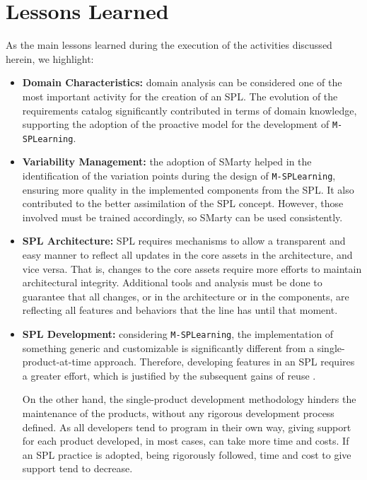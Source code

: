 \section{Lessons Learned}\label{section4}

As the main lessons learned during the execution of the activities discussed herein, we highlight:

\begin{itemize}
\setlength\itemsep{1em}
\item \textbf{Domain Characteristics:} domain analysis can be considered one of the most important activity for the creation of an SPL. The evolution of the requirements catalog \cite{filho13} significantly contributed in terms of domain knowledge, supporting the adoption of the proactive model for the development of \texttt{M-SPLear\allowbreak ning}.
    
\item \textbf{Variability Management:} the adoption of SMarty helped in the identification of the variation points during the design of \texttt{M-SPLear\allowbreak ning}, ensuring more quality in the implemented components from the SPL. It also contributed to the better assimilation of the SPL concept. However, those involved must be trained accordingly, so SMarty can be used consistently.
    
\item \textbf{SPL Architecture:} SPL requires mechanisms to allow a transparent and easy manner to reflect all updates in the core assets in the architecture, and vice versa. That is, changes to the core assets require more efforts to maintain architectural integrity. Additional tools and analysis must be done to guarantee that all changes, or in the architecture or in the components, are reflecting all features and behaviors that the line has until that moment.
    
\item \textbf{SPL Development:} considering \texttt{M-SPLear\allowbreak ning}, the implementation of something generic and customizable is significantly different from a single-product-at-time approach. Therefore, developing features in an SPL requires a greater effort, which is justified by the subsequent gains of reuse \cite{clements02}.

On the other hand, the single-product development methodology hinders the maintenance of the products, without any rigorous development process defined. As all developers tend to program in their own way, giving support for each product developed, in most cases, can take more time and costs. If an SPL practice is adopted, being rigorously followed, time and cost to give support tend to decrease.
    

\end{itemize}
